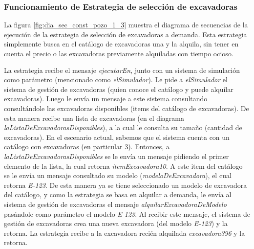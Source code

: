 \subsubsection{Funcionamiento de Estrategia de selección de excavadoras}
\label{sec:dia_sec_estr_selec_exc}
\par La figura \ref{fig:dia_sec_const_pozo_1_3} muestra el diagrama de secuencias de la ejecución de la estrategia de selección de excavadoras a demanda. Esta estrategia simplemente busca en el catálogo de excavadoras una y la alquila, sin tener en cuenta el precio o las excavadoras previamente alquiladas con tiempo ocioso.

\par La estrategia recibe el mensaje \textit{ejecutarEn}, junto con un sistema de simulación como parámetro (mencionado como \textit{elSimulador}). Le pide a \textit{elSimulador} el sistema de gestión de excavadoras (quien conoce el catálogo y puede alquilar excavadoras). Luego le envía un mensaje a este sistema consultando consultándole las excavadoras disponibles (items del catálogo de excavadoras). De esta manera recibe una lista de excavadoras (en el diagrama \textit{laListaDeExcavadorasDisponibles}), a la cual le consulta su tamaño (cantidad de excavadoras). En el escenario actual, sabemos que el sistema cuenta con un catálogo con excavadoras (en particular 3). Entonces, a \textit{laListaDeExcavadorasDisponibles} se le envía un mensaje pidiendo el primer elemento de la lista, la cual retorna \textit{itemExcavadora10}. A este item del catálogo se le envía un mensaje consultado su modelo (\textit{modeloDeExcavadora}), el cual retorna \textit{E-123}. De esta manera ya se tiene seleccionado un modelo de excavadora del catálogo, y como la estrategia se basa en alquilar a demanda, le envía al sistema de gestión de excavadoras el mensaje \textit{alquilarExcavadoraDeModelo} pasándole como parámetro el modelo \textit{E-123}. Al recibir este mensaje, el sistema de gestión de excavadoras crea una nueva excavadora (del modelo \textit{E-123}) y la retorna. La estrategia recibe a la excavadora recién alquilada \textit{excavadora396} y la retorna.
